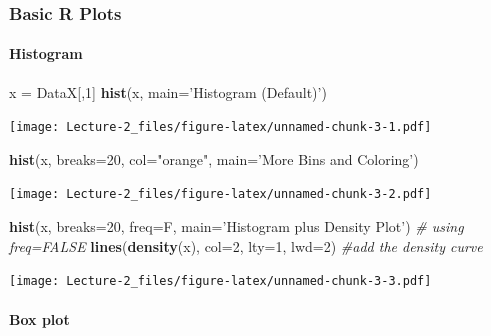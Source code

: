 \documentclass[
]{article}
\newenvironment{Shaded}{\begin{snugshade}}{\end{snugshade}}
\newcommand{\CommentTok}[1]{\textcolor[rgb]{0.56,0.35,0.01}{\textit{#1}}}
\newcommand{\DataTypeTok}[1]{\textcolor[rgb]{0.13,0.29,0.53}{#1}}
\newcommand{\DecValTok}[1]{\textcolor[rgb]{0.00,0.00,0.81}{#1}}
\newcommand{\KeywordTok}[1]{\textcolor[rgb]{0.13,0.29,0.53}{\textbf{#1}}}
\newcommand{\NormalTok}[1]{#1}
\newcommand{\StringTok}[1]{\textcolor[rgb]{0.31,0.60,0.02}{#1}}
\begin{document}
\hypertarget{basic-r-plots}{%
\subsubsection{Basic R Plots}\label{basic-r-plots}}

\hypertarget{histogram}{%
\paragraph{Histogram}\label{histogram}}

\begin{Shaded}
\begin{Highlighting}[]
\NormalTok{x =}\StringTok{ }\NormalTok{DataX[,}\DecValTok{1}\NormalTok{]}
\KeywordTok{hist}\NormalTok{(x, }\DataTypeTok{main=}\StringTok{'Histogram (Default)'}\NormalTok{)   }
\end{Highlighting}
\end{Shaded}

\texttt{[image: Lecture-2\_files/figure-latex/unnamed-chunk-3-1.pdf]}

\begin{Shaded}
\begin{Highlighting}[]
\KeywordTok{hist}\NormalTok{(x, }\DataTypeTok{breaks=}\DecValTok{20}\NormalTok{, }\DataTypeTok{col=}\StringTok{"orange"}\NormalTok{, }\DataTypeTok{main=}\StringTok{'More Bins and Coloring'}\NormalTok{) }
\end{Highlighting}
\end{Shaded}

\texttt{[image: Lecture-2\_files/figure-latex/unnamed-chunk-3-2.pdf]}

\begin{Shaded}
\begin{Highlighting}[]
\KeywordTok{hist}\NormalTok{(x, }\DataTypeTok{breaks=}\DecValTok{20}\NormalTok{, }\DataTypeTok{freq=}\NormalTok{F, }\DataTypeTok{main=}\StringTok{'Histogram plus Density Plot'}\NormalTok{)   }\CommentTok{# using freq=FALSE}
\KeywordTok{lines}\NormalTok{(}\KeywordTok{density}\NormalTok{(x), }\DataTypeTok{col=}\DecValTok{2}\NormalTok{, }\DataTypeTok{lty=}\DecValTok{1}\NormalTok{, }\DataTypeTok{lwd=}\DecValTok{2}\NormalTok{)  }\CommentTok{#add the density curve}
\end{Highlighting}
\end{Shaded}

\texttt{[image: Lecture-2\_files/figure-latex/unnamed-chunk-3-3.pdf]}

\hypertarget{box-plot}{%
\paragraph{Box plot}\label{box-plot}}
\end{document}
